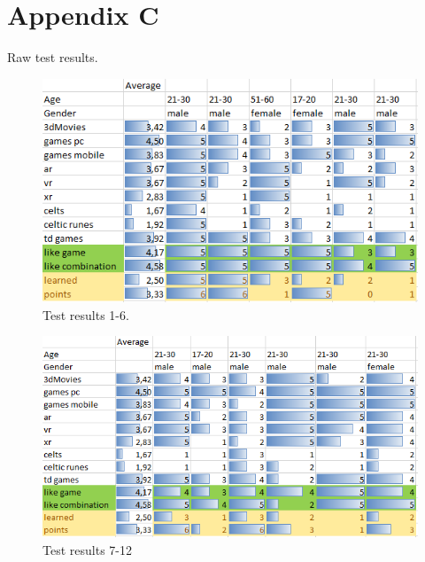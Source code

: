 \clearpage
\pagebreak
\vspace*{-3.5cm}
\section{Appendix C}
\label{appendix-userstudy}

Raw test results.

\begin{figure}[H]
	\centering
	\includegraphics[width=0.95\linewidth]{figures/test-results1.png}
	\caption{Test results 1-6.}
	\label{fig:test-result1}
\end{figure}

\begin{figure}[H]
	\centering
	\includegraphics[width=0.95\linewidth]{figures/test-results2.png}
	\caption{Test results 7-12}
		\label{fig:test-result1}
\end{figure}


